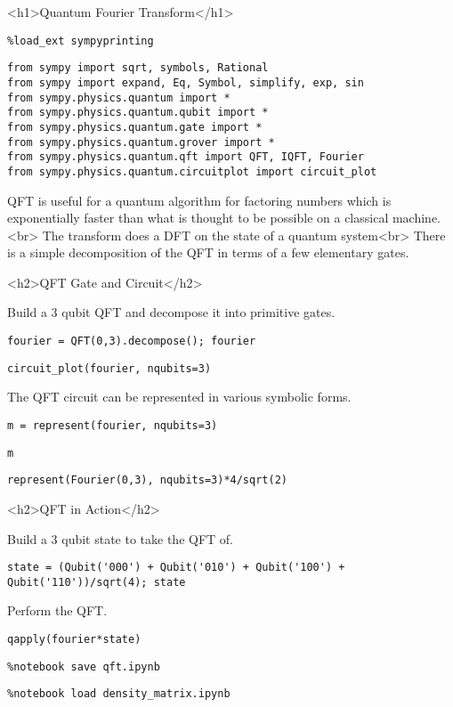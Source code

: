 <h1>Quantum Fourier Transform</h1>

\begin{verbatim}
%load_ext sympyprinting
\end{verbatim}

\begin{verbatim}
from sympy import sqrt, symbols, Rational
from sympy import expand, Eq, Symbol, simplify, exp, sin
from sympy.physics.quantum import *
from sympy.physics.quantum.qubit import *
from sympy.physics.quantum.gate import *
from sympy.physics.quantum.grover import *
from sympy.physics.quantum.qft import QFT, IQFT, Fourier
from sympy.physics.quantum.circuitplot import circuit_plot
\end{verbatim}

QFT is useful for a quantum algorithm for factoring numbers which is
exponentially faster than what is thought to be possible on a classical
machine.<br> The transform does a DFT on the state of a quantum system<br> There
is a simple decomposition of the QFT in terms of a few elementary gates.

<h2>QFT Gate and Circuit</h2>

Build a 3 qubit QFT and decompose it into primitive gates.

\begin{verbatim}
fourier = QFT(0,3).decompose(); fourier
\end{verbatim}

\begin{verbatim}
circuit_plot(fourier, nqubits=3)
\end{verbatim}

The QFT circuit can be represented in various symbolic forms.

\begin{verbatim}
m = represent(fourier, nqubits=3)
\end{verbatim}

\begin{verbatim}
m
\end{verbatim}

\begin{verbatim}
represent(Fourier(0,3), nqubits=3)*4/sqrt(2)
\end{verbatim}

<h2>QFT in Action</h2>

Build a 3 qubit state to take the QFT of.

\begin{verbatim}
state = (Qubit('000') + Qubit('010') + Qubit('100') + Qubit('110'))/sqrt(4); state
\end{verbatim}

Perform the QFT.

\begin{verbatim}
qapply(fourier*state)
\end{verbatim}

\begin{verbatim}
%notebook save qft.ipynb
\end{verbatim}

\begin{verbatim}
%notebook load density_matrix.ipynb
\end{verbatim}

